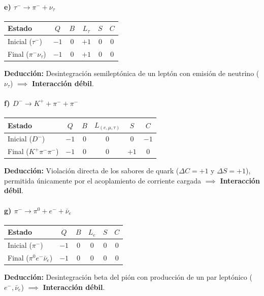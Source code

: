 \begin{problema}
\paragraph{e) $\tau^- \rightarrow \pi^- + \nu_\tau$}
\begin{center}
\small
\begin{tabular}{lccccc}
\toprule
\textbf{Estado} & $Q$ & $B$ & $L_\tau$ & $S$ & $C$ \\
\midrule
Inicial ($\tau^-$) & $-1$ & $0$ & $+1$ & $0$ & $0$ \\
Final ($\pi^- \nu_\tau$) & $-1$ & $0$ & $+1$ & $0$ & $0$ \\
\bottomrule
\end{tabular}
\end{center}
\textbf{Deducción:} Desintegración semileptónica de un leptón con emisión de neutrino ($\nu_\tau$) $\implies$ \textbf{Interacción débil}.

\paragraph{f) $D^- \rightarrow K^+ + \pi^- + \pi^-$}
\begin{center}
\small
\begin{tabular}{lccccc}
\toprule
\textbf{Estado} & $Q$ & $B$ & $L_{(e,\mu,\tau)}$ & $S$ & $C$ \\
\midrule
Inicial ($D^-$) & $-1$ & $0$ & $0$ & $0$ & $-1$ \\
Final ($K^+ \pi^- \pi^-$) & $-1$ & $0$ & $0$ & $+1$ & $0$ \\
\bottomrule
\end{tabular}
\end{center}
\textbf{Deducción:} Violación directa de los sabores de quark ($\Delta C = +1$ y $\Delta S = +1$), permitida únicamente por el acoplamiento de corriente cargada $\implies$ \textbf{Interacción débil}.

\paragraph{g) $\pi^- \rightarrow \pi^0 + e^- + \bar{\nu}_e$}
\begin{center}
\small
\begin{tabular}{lccccc}
\toprule
\textbf{Estado} & $Q$ & $B$ & $L_e$ & $S$ & $C$ \\
\midrule
Inicial ($\pi^-$) & $-1$ & $0$ & $0$ & $0$ & $0$ \\
Final ($\pi^0 e^- \bar{\nu}_e$) & $-1$ & $0$ & $0$ & $0$ & $0$ \\
\bottomrule
\end{tabular}
\end{center}
\textbf{Deducción:} Desintegración beta del pión con producción de un par leptónico ($e^-, \bar{\nu}_e$) $\implies$ \textbf{Interacción débil}.


\end{problema}
